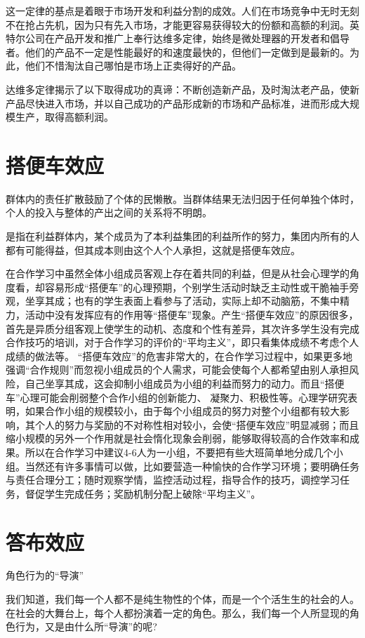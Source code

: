 \documentclass[11pt]{ctexart}
\begin{document}
这一定律的基点是着眼于市场开发和利益分割的成效。人们在市场竞争中无时无刻不在抢占先机，因为只有先入市场，才能更容易获得较大的份额和高额的利润。英特尔公司在产品开发和推广上奉行达维多定律，始终是微处理器的开发者和倡导者。他们的产品不一定是性能最好的和速度最快的，但他们一定做到是最新的。为此，他们不惜淘汰自己哪怕是市场上正卖得好的产品。

达维多定律揭示了以下取得成功的真谛：不断创造新产品，及时淘汰老产品，使新产品尽快进入市场，并以自己成功的产品形成新的市场和产品标准，进而形成大规模生产，取得高额利润。
\section{搭便车效应}
\label{sec-26}


群体内的责任扩散鼓励了个体的民懒散。当群体结果无法归因于任何单独个体时，个人的投入与整体的产出之间的关系将不明朗。

是指在利益群体内，某个成员为了本利益集团的利益所作的努力，集团内所有的人都有可能得益，但其成本则由这个人个人承担，这就是搭便车效应。

在合作学习中虽然全体小组成员客观上存在着共同的利益，但是从社会心理学的角度看，却容易形成“搭便车”的心理预期，个别学生活动时缺乏主动性或干脆袖手旁观，坐享其成；也有的学生表面上看参与了活动，实际上却不动脑筋，不集中精力，活动中没有发挥应有的作用等“搭便车”现象。产生“搭便车效应”的原因很多，首先是异质分组客观上使学生的动机、态度和个性有差异，其次许多学生没有完成合作技巧的培训，对于合作学习的评价的“平均主义”，即只看集体成绩不考虑个人成绩的做法等。 “搭便车效应”的危害非常大的，在合作学习过程中，如果更多地强调“合作规则”而忽视小组成员的个人需求，可能会使每个人都希望由别人承担风险，自己坐享其成，这会抑制小组成员为小组的利益而努力的动力。而且“搭便车”心理可能会削弱整个合作小组的创新能力、
凝聚力、积极性等。心理学研究表明，如果合作小组的规模较小，由于每个小组成员的努力对整个小组都有较大影响，其个人的努力与奖励的不对称性相对较小，会使“搭便车效应”明显减弱；而且缩小规模的另外一个作用就是社会惰化现象会削弱，能够取得较高的合作效率和成果。所以在合作学习中建议4-6人为一小组，不要把有些大班简单地分成几个小组。当然还有许多事情可以做，比如要营造一种愉快的合作学习环境；要明确任务与责任合理分工；随时观察学情，监控活动过程，指导合作的技巧，调控学习任务，督促学生完成任务；奖励机制分配上破除“平均主义”。
\section{答布效应}
\label{sec-27}


角色行为的“导演”

我们知道，我们每一个人都不是纯生物性的个体，而是一个个活生生的社会的人。在社会的大舞台上，每个人都扮演着一定的角色。那么，我们每一个人所显现的角色行为，又是由什么所“导演”的呢?
\end{document}
